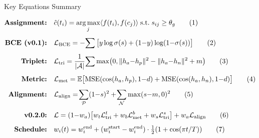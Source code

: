 \documentclass[aspectratio=169,10pt]{beamer}
\newcommand{\Lcal}{\mathcal{L}}
\newcommand{\inner}[2]{\langle #1, #2 \rangle}
\DeclareMathOperator*{\argmax}{arg\,max}
\begin{document}
\begin{frame}{Key Equations Summary}

{\small
\begin{align}
  \text{\textbf{Assignment:}} \quad & \hat{c}(t_i) = \argmax_j \inner{f(t_i)}{f(c_j)} \;\text{s.t.}\; s_{ij} \geq \theta_g \tag{1} \\[4pt]
  \text{\textbf{BCE (v0.1):}} \quad & \Lcal_{\text{BCE}} = -\!\sum \big[y\log\sigma(s) + (1{-}y)\log(1{-}\sigma(s))\big] \tag{2} \\[4pt]
  \text{\textbf{Triplet:}} \quad & \Lcal_{\text{tri}} = \frac{1}{|\mathcal{A}|}\!\sum\max\!\big(0, \|h_a{-}h_p\|^2 - \|h_a{-}h_n\|^2 + m\big) \tag{3} \\[4pt]
  \text{\textbf{Metric:}} \quad & \Lcal_{\text{met}} = \mathbb{E}\big[\text{MSE}(\cos(h_a,h_p), 1{-}d) + \text{MSE}(\cos(h_a,h_n), 1{-}d)\big] \tag{4} \\[4pt]
  \text{\textbf{Alignment:}} \quad & \Lcal_{\text{align}} = \!\sum_{\mathcal{P}}(1{-}s)^2 + \!\sum_{\mathcal{N}}\max(s{-}m, 0)^2 \tag{5} \\[4pt]
  \text{\textbf{v0.2.0:}} \quad & \Lcal = (1{-}w_a)\big[w_t\Lcal_{\text{tri}}^t + w_b\Lcal_{\text{met}}^b + w_s\Lcal_{\text{tri}}^s\big] + w_a\Lcal_{\text{align}} \tag{6} \\[4pt]
  \text{\textbf{Schedule:}} \quad & w_i(t) = w_i^{\text{end}} + (w_i^{\text{start}} - w_i^{\text{end}}) \cdot \tfrac{1}{2}(1 + \cos(\pi t / T)) \tag{7}
\end{align}
}
\end{frame}

\end{document}
